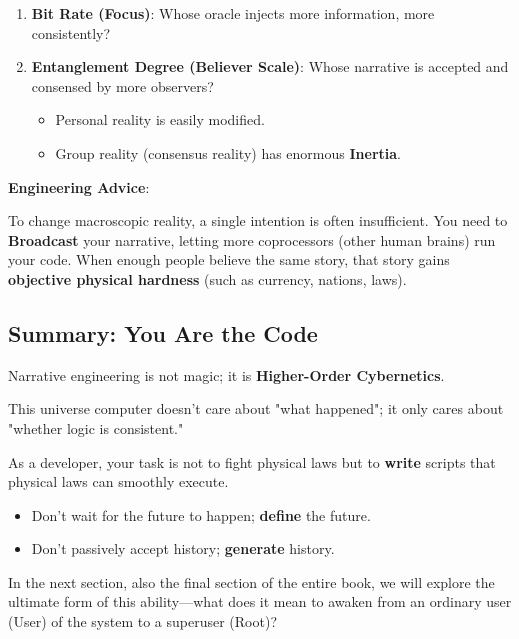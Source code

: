 \begin{enumerate}
\item \textbf{Bit Rate (Focus)}: Whose oracle injects more information, more consistently?

\item \textbf{Entanglement Degree (Believer Scale)}: Whose narrative is accepted and consensed by more observers?

    \begin{itemize}
    \item Personal reality is easily modified.

    \item Group reality (consensus reality) has enormous \textbf{Inertia}.
    \end{itemize}
\end{enumerate}

\textbf{Engineering Advice}:

To change macroscopic reality, a single intention is often insufficient. You need to \textbf{Broadcast} your narrative, letting more coprocessors (other human brains) run your code. When enough people believe the same story, that story gains \textbf{objective physical hardness} (such as currency, nations, laws).

\subsection{Summary: You Are the Code}

Narrative engineering is not magic; it is \textbf{Higher-Order Cybernetics}.

This universe computer doesn't care about "what happened"; it only cares about "whether logic is consistent."

As a developer, your task is not to fight physical laws but to \textbf{write} scripts that physical laws can smoothly execute.

\begin{itemize}
\item Don't wait for the future to happen; \textbf{define} the future.

\item Don't passively accept history; \textbf{generate} history.
\end{itemize}

In the next section, also the final section of the entire book, we will explore the ultimate form of this ability—what does it mean to awaken from an ordinary user (User) of the system to a superuser (Root)?

